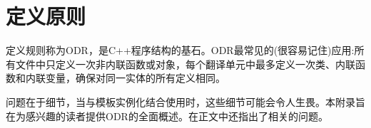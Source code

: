 \chapter{定义原则}
定义规则称为ODR，是C++程序结构的基石。ODR最常见的(很容易记住)应用:所有文件中只定义一次非内联函数或对象，每个翻译单元中最多定义一次类、内联函数和内联变量，确保对同一实体的所有定义相同。

问题在于细节，当与模板实例化结合使用时，这些细节可能会令人生畏。本附录旨在为感兴趣的读者提供ODR的全面概述。在正文中还指出了相关的问题。


